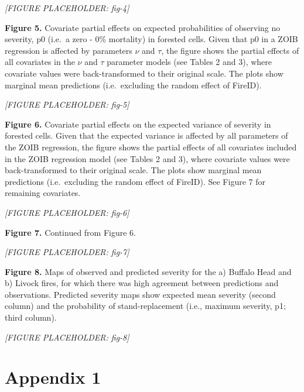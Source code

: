 \documentclass[
  numafflabel,
  authoryear,
  preprint]{elsarticle}
\begin{document}
\emph{{[}FIGURE PLACEHOLDER: fig-4{]}}

\newpage{}

\textbf{Figure 5.} Covariate partial effects on expected probabilities
of observing no severity, p0 (i.e.~a zero - 0\% mortality) in forested
cells. Given that p0 in a ZOIB regression is affected by parameters
\(\nu\) and \(\tau\), the figure shows the partial effects of all
covariates in the \(\nu\) and \(\tau\) parameter models (see Tables 2
and 3), where covariate values were back-transformed to their original
scale. The plots show marginal mean predictions (i.e.~excluding the
random effect of FireID).

\emph{{[}FIGURE PLACEHOLDER: fig-5{]}}

\newpage{}

\textbf{Figure 6.} Covariate partial effects on the expected variance of
severity in forested cells. Given that the expected variance is affected
by all parameters of the ZOIB regression, the figure shows the partial
effects of all covariates included in the ZOIB regression model (see
Tables 2 and 3), where covariate values were back-transformed to their
original scale. The plots show marginal mean predictions (i.e.~excluding
the random effect of FireID). See Figure 7 for remaining covariates.

\emph{{[}FIGURE PLACEHOLDER: fig-6{]}}

\newpage{}

\textbf{Figure 7.} Continued from Figure 6.

\emph{{[}FIGURE PLACEHOLDER: fig-7{]}}

\newpage{}

\begin{landscape}

\textbf{Figure 8.} Maps of observed and predicted severity for the a)
Buffalo Head and b) Livock fires, for which there was high agreement
between predictions and observations. Predicted severity maps show
expected mean severity (second column) and the probability of
stand-replacement (i.e., maximum severity, p1; third column).

\emph{{[}FIGURE PLACEHOLDER: fig-8{]}}

\end{landscape}

\newpage{}

\section{Appendix 1}\label{appendix-1}
\end{document}
